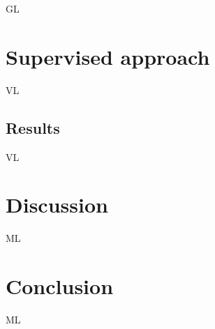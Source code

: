 \documentclass[journal]{IEEEtran}
\begin{document}
GL

\section{Supervised approach}

VL


\subsection{Results}

VL

\section{Discussion}

ML

\section{Conclusion}

ML




% 










\end{document}
